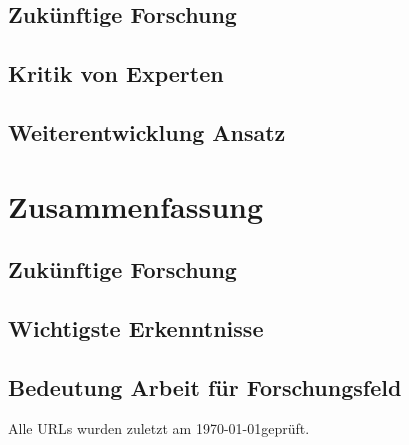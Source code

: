 \documentclass[
  ngerman,
  a4paper,  %
  twoside,  %
  bibliography=totoc,
  headsepline,
  cleardoublepage=empty,
  parskip=half,
  draft=false
]{scrbook}
\begin{document}

\section{Zukünftige Forschung}
\section{Kritik von Experten}
\section{Weiterentwicklung Ansatz}

\chapter{Zusammenfassung \label{chp:zusammenfassung}}
\section{Zukünftige Forschung}
\section{Wichtigste Erkenntnisse}
\section{Bedeutung Arbeit für Forschungsfeld}

\printbibliography

Alle URLs wurden zuletzt am \today \space geprüft.

\appendix


\pagestyle{empty}
\renewcommand*{\chapterpagestyle}{empty}
\Versicherung
\end{document}
